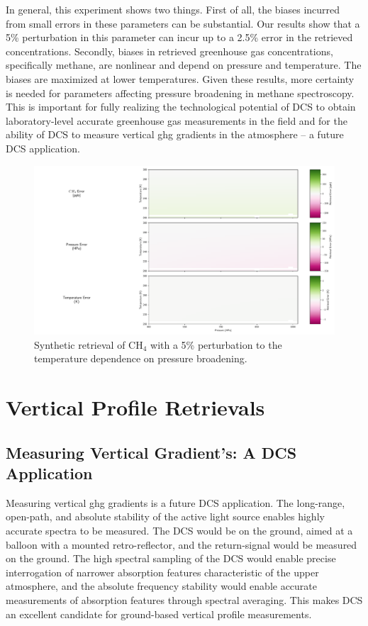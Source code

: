 \documentclass[amt, manuscript]{copernicus}
\begin{document}
In general, this experiment shows two things. First of all, the biases incurred from small errors in these parameters can be substantial. Our results show that a 5\% perturbation in this parameter can incur up to a 2.5\% error in the retrieved concentrations. Secondly, biases in retrieved greenhouse gas concentrations, specifically methane, are nonlinear and depend on pressure and temperature. The biases are maximized at lower temperatures. Given these results, more certainty is needed for parameters affecting pressure broadening in methane spectroscopy. This is important for fully realizing the technological potential of DCS to obtain laboratory-level accurate greenhouse gas measurements in the field and for the ability of DCS to measure vertical ghg gradients in the atmosphere – a future DCS application.
\begin{figure}
  \centering
  \includegraphics{ch4_params_pert.pdf}
  \caption{Synthetic retrieval of CH$_4$ with a 5\% perturbation to the temperature dependence on pressure broadening.}
  \label{fig:param_pert}
\end{figure}
\section{Vertical Profile Retrievals}
\subsection{Measuring Vertical Gradient’s: A DCS Application }
Measuring vertical ghg gradients is a future DCS application. The long-range, open-path, and absolute stability of the active light source enables highly accurate spectra to be measured. The DCS would be on the ground, aimed at a balloon with a mounted retro-reflector, and the return-signal would be measured on the ground. The high spectral sampling of the DCS would enable precise interrogation of narrower absorption features characteristic of the upper atmosphere, and the absolute frequency stability would enable accurate measurements of absorption features through spectral averaging. This makes DCS an excellent candidate for ground-based vertical profile measurements.
\end{document}

